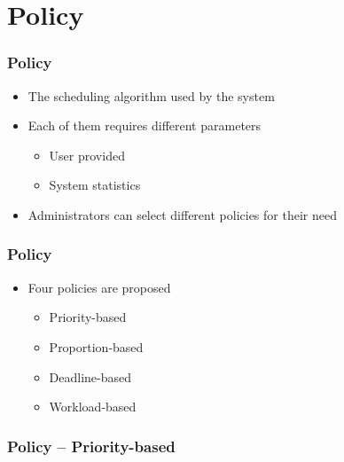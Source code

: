 \documentclass{beamer}
\begin{document}
\section{Policy}
\begin{frame}
  \frametitle{Policy}
  \begin{itemize}
    \item The scheduling algorithm used by the system
    \item Each of them requires different parameters
      \begin{itemize}
        \item User provided
        \item System statistics
      \end{itemize}
    \item Administrators can select different policies for their need
  \end{itemize}
\end{frame}
\begin{frame}
  \frametitle{Policy}
  \begin{itemize}
    \item Four policies are proposed
      \begin{itemize}
        \item Priority-based
        \item Proportion-based
        \item Deadline-based
        \item Workload-based
      \end{itemize}
  \end{itemize}
\end{frame}
\begin{frame}
  \frametitle{Policy -- Priority-based}
\end{frame}
\end{document}
